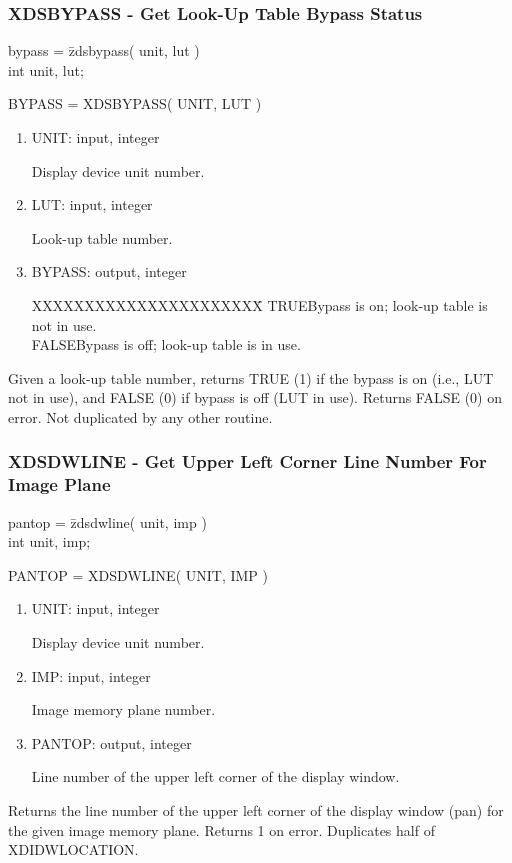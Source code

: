 \subsubsection{XDSBYPASS - Get Look-Up Table Bypass Status}
\begin{tabbing}
bypass = \=zdsbypass( unit, lut )\\
\>int  unit, lut;\\
\end{tabbing}
BYPASS = XDSBYPASS( UNIT, LUT )
\begin{enumerate}
\item UNIT:  input, integer

Display device unit number.
\item LUT:  input, integer

Look-up table number.
\item BYPASS:  output, integer
\begin{tabbing}
XXXXXXXXXXXXXXXXXXXXXX\=\kill
TRUE\>Bypass is on; look-up table is not in use.\\
FALSE\>Bypass is off; look-up table is in use.\\
\end{tabbing}
\end{enumerate}
Given a look-up table number, returns TRUE (1) if the bypass is on (i.e.,
LUT not in use), and FALSE (0) if bypass is off (LUT in use).  Returns
FALSE (0) on error.  Not duplicated by any other routine.
\newpage
\subsubsection{XDSDWLINE - Get Upper Left Corner Line Number For Image Plane}
\begin{tabbing}
pantop = \=zdsdwline( unit, imp )\\
\>int  unit, imp;\\
\end{tabbing}
PANTOP = XDSDWLINE( UNIT, IMP )
\begin{enumerate}
\item UNIT:  input, integer

Display device unit number.
\item IMP:  input, integer

Image memory plane number.
\item PANTOP:  output, integer

Line number of the upper left corner of the display window.
\end{enumerate}
Returns the line number of the upper left corner of the display window
(pan) for the given image memory plane.  Returns 1 on error.  Duplicates
half of XDIDWLOCATION.
\newpage
